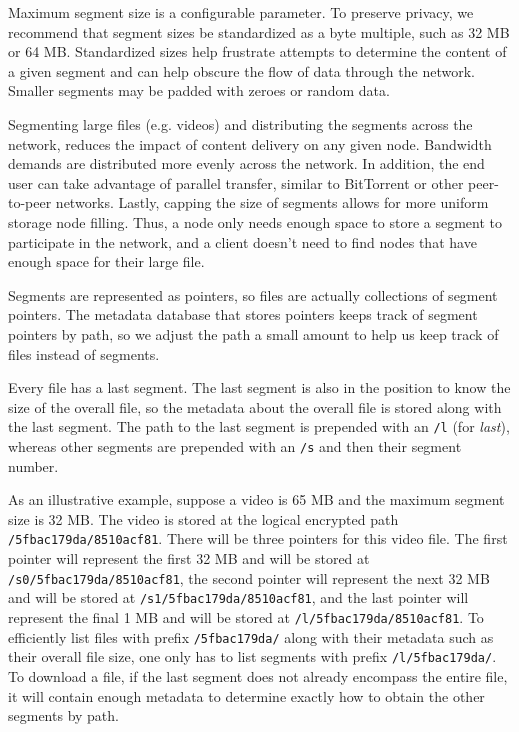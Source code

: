 \documentclass[11pt,fleqn,openany]{book}
\begin{document}
Maximum segment size is a configurable parameter. To preserve privacy, we
recommend that segment sizes be standardized as a byte multiple, such as
32 MB or 64 MB.
Standardized sizes help frustrate attempts to determine the content of a given
segment and can help obscure the flow of data through the network.
Smaller segments may be padded with zeroes or random data.

Segmenting large files (e.g. videos) and distributing the segments
across the network, reduces the impact of content delivery on any
given node.
Bandwidth demands are distributed more evenly across the network.
In addition, the end user can take advantage of parallel transfer, similar to
BitTorrent or other peer-to-peer networks. Lastly, capping the size of segments
allows for more uniform storage node filling. Thus, a node only needs enough
space to store a segment to participate in the network,
and a client doesn't need
to find nodes that have enough space for their large file.

Segments are represented as pointers, so files are actually
collections of segment pointers. The metadata database that stores
pointers keeps track of segment pointers by path, so we adjust the
path a small amount to help us keep track of files instead of
segments.

Every file has a last segment. The last segment is also in the
position to know the size of the overall file, so the metadata about the
overall file is stored along with the last segment. The path to
the last segment is prepended with an {\tt /l} (for {\em last}), whereas
other segments are prepended with an {\tt /s} and then their segment number.

As an illustrative example, suppose a video is 65 MB and the maximum
segment size is 32 MB. The video is stored at the logical encrypted path
{\tt /5fbac179da/8510acf81}. There will be three pointers for this video
file. The first pointer will represent the first 32 MB and will be
stored at {\tt /s0/5fbac179da/8510acf81}, the second pointer will represent
the next 32 MB and will be stored at {\tt /s1/5fbac179da/8510acf81}, and the
last pointer will represent the final 1 MB and will be stored at
{\tt /l/5fbac179da/8510acf81}. To efficiently list files with prefix
{\tt /5fbac179da/} along with their metadata such as their overall file size,
one only has to list segments with prefix {\tt /l/5fbac179da/}. To download a
file, if the last segment does not already encompass the entire file, it will
contain enough metadata to determine exactly how to obtain the other segments
by path.
\end{document}
